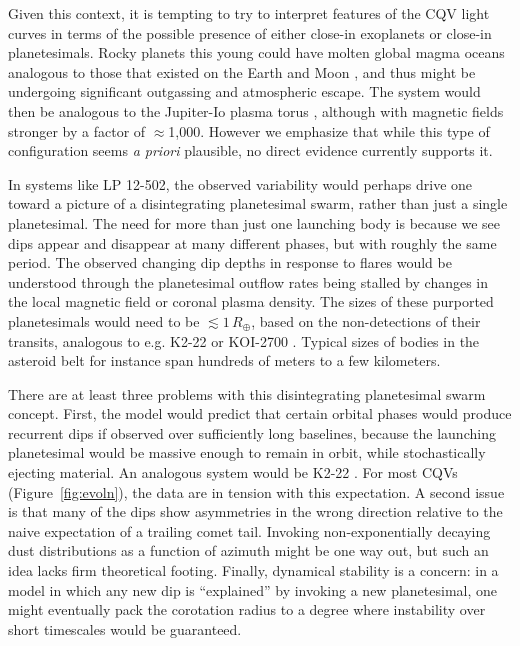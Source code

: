 \documentclass[11pt,twocolumn,tighten]{aastex63}
\begin{document}
Given this context, it is tempting to try to interpret features of the
CQV light curves in terms of the possible presence of either close-in
exoplanets or close-in planetesimals.  Rocky planets this young could
have molten global magma oceans analogous to those that existed on the
Earth and Moon \citep[see][]{2022arXiv220310023L}, and thus might be
undergoing significant outgassing and atmospheric escape.  The system
would then be analogous to the Jupiter-Io plasma torus
\citep[e.g.][]{1980JGR....85.1171N}, although with magnetic fields
stronger by a factor of $\approx$1{,}000.  However we emphasize that
while this type of configuration seems {\it a priori} plausible, no
direct evidence currently supports it.

In systems like LP 12-502, the observed variability would perhaps
drive one toward a picture of a disintegrating planetesimal swarm,
rather than just a single planetesimal.  The need for more than just
one launching body is because we see dips appear and disappear at many
different phases, but with roughly the same period.  The observed
changing dip depths in response to flares would be understood through
the planetesimal outflow rates being stalled by changes in the local
magnetic field or coronal plasma density.  The sizes of these
purported planetesimals would need to be $\lesssim 1$\,$R_\oplus$,
based on the non-detections of their transits, analogous to e.g.
K2-22 \citep{2015ApJ...812..112S} or KOI-2700
\citep{2014ApJ...784...40R}.  Typical sizes of bodies in the asteroid
belt for instance span hundreds of meters to a few kilometers.

There are at least three problems with this disintegrating
planetesimal swarm concept.  First, the model would predict that
certain orbital phases would produce recurrent dips if observed over
sufficiently long baselines, because the launching planetesimal would
be massive enough to remain in orbit, while stochastically ejecting
material.  An analogous system would be K2-22
\citep{2015ApJ...812..112S}.  For most CQVs (Figure~\ref{fig:evoln}),
the data are in tension with this expectation.  A second issue is that
many of the dips show asymmetries in the wrong direction relative to
the naive expectation of a trailing comet tail.  Invoking
non-exponentially decaying dust distributions as a function of azimuth
might be one way out, but such an idea lacks firm theoretical footing.
Finally, dynamical stability is a concern: in a model in which any new
dip is ``explained'' by invoking a new planetesimal, one might
eventually pack the corotation radius to a degree where instability
over short timescales would be guaranteed.
\end{document}
